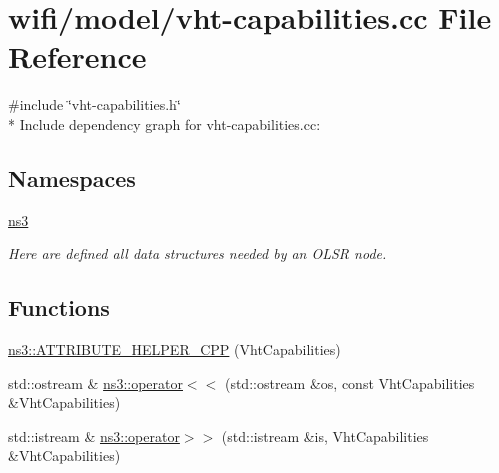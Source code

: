 \hypertarget{vht-capabilities_8cc}{}\section{wifi/model/vht-\/capabilities.cc File Reference}
\label{vht-capabilities_8cc}
{\ttfamily \#include \char`\"{}vht-\/capabilities.\+h\char`\"{}}\\*
Include dependency graph for vht-\/capabilities.cc\+:
\subsection*{Namespaces}
\begin{DoxyCompactItemize}
\item 
 \hyperlink{namespacens3}{ns3}
\begin{DoxyCompactList}\small\item\em Here are defined all data structures needed by an O\+L\+SR node. \end{DoxyCompactList}\end{DoxyCompactItemize}
\subsection*{Functions}
\begin{DoxyCompactItemize}
\item 
\hyperlink{namespacens3_a79753528d5ee5b7b690505fdc3913ddc}{ns3\+::\+A\+T\+T\+R\+I\+B\+U\+T\+E\+\_\+\+H\+E\+L\+P\+E\+R\+\_\+\+C\+PP} (Vht\+Capabilities)
\item 
std\+::ostream \& \hyperlink{namespacens3_a4b05f8ae914ef1326f2330a8426a498c}{ns3\+::operator$<$$<$} (std\+::ostream \&os, const Vht\+Capabilities \&Vht\+Capabilities)
\item 
std\+::istream \& \hyperlink{namespacens3_a6e4616316048a7f526bdd79ba0f8ba67}{ns3\+::operator$>$$>$} (std\+::istream \&is, Vht\+Capabilities \&Vht\+Capabilities)
\end{DoxyCompactItemize}
